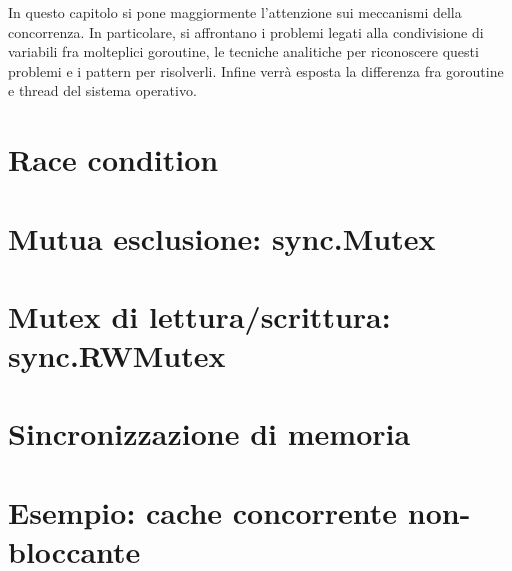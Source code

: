 In questo capitolo si pone maggiormente l'attenzione sui meccanismi della concorrenza.
In particolare, si affrontano i problemi legati alla condivisione di variabili fra molteplici goroutine, le tecniche analitiche per riconoscere questi problemi e i pattern per risolverli.
Infine verrà esposta la differenza fra goroutine e thread del sistema operativo.


\section{Race condition}
\label{sec:race_condition}


\section{Mutua esclusione: sync.Mutex}
\label{sec:mutua_esclusione_syncmutex}


\section{Mutex di lettura/scrittura: sync.RWMutex}
\label{sec:mutex_di_lettura_scrittura_syncrwmutex}%



\section{Sincronizzazione di memoria}
\label{sec:sincronizzazione_di_memoria}%



\section{Esempio: cache concorrente non-bloccante}
\label{sec:esempio_cache_concorrente_nonbloccante}


